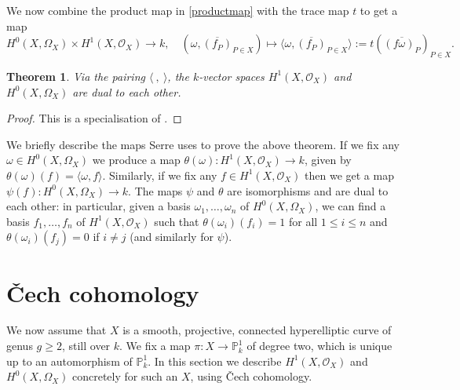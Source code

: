 \documentclass[11pt]{article} %
\theoremstyle{plain}
\newtheorem{thm}[defn]{Theorem}
\theoremstyle{remark}
\newcommand{\ra}{\rightarrow}
\newcommand{\cech}{\v{C}ech }
\newcommand{\hzero}{{H^0(X,\Omega_X)}}
\newcommand{\hone}{H^1(X,\mathcal{O}_X)}
\begin{document}
We now combine the product map in \eqref{productmap} with the trace map $t$ to get a map 
\[
 \hzero \times \hone \ra k,\quad (\omega, \overline{(f_P)}_{P \in X}) \mapsto \langle \omega, \overline{(f_P)}_{P \in X} \rangle := t \left( \overline{(f \omega)_P} \right)_{P \in X}.
\]

\begin{thm}\label{serredualitytheorem}
Via the pairing $\langle\ ,\ \rangle$, the $k$-vector spaces $\hone$ and $\hzero$ are dual to each other.
\end{thm}
\begin{proof}
This is a specialisation of \cite[Thm. 2, Chap. II]{algebraicgroupsandclassfields}.
\end{proof}

We briefly describe the maps Serre uses to prove the above theorem.
If we fix any $\omega \in \hzero$ we produce a map $\theta(\omega)\colon \hone \ra k$, given by $\theta(\omega)(f) = \langle \omega , f\rangle$.
Similarly, if we fix any $f \in \hone$ then we get a map $\psi(f) \colon \hzero \ra k$.
The maps $\psi$ and $\theta$ are isomorphisms and are dual to each other: in particular, given a basis $\omega_1, \ldots, \omega_n$ of $\hzero$, we can find a basis $f_1, \ldots , f_n$ of $\hone$ such that $\theta(\omega_i)(f_i) = 1$ for all $1 \leq i \leq n$ and $\theta(\omega_i)(f_j) = 0$ if $i \neq j$ (and similarly for $\psi$).


\section{\cech cohomology}
We now assume that $X$ is a smooth, projective, connected hyperelliptic curve of genus $g \geq 2$, still over $k$.
We  fix a map $\pi \colon X \rightarrow \mathbb P_k^1$ of degree two, which is unique up to an automorphism of $\mathbb P_k^1$.
In this section we describe $\hone$ and $\hzero$ concretely for such an $X$, using \cech cohomology.
\end{document}
